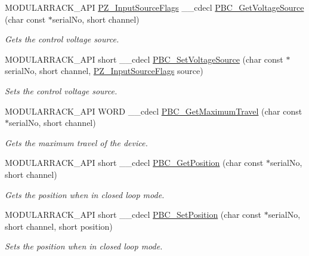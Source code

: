 \begin{DoxyCompactItemize}
M\+O\+D\+U\+L\+A\+R\+R\+A\+C\+K\+\_\+\+A\+PI \hyperlink{group___common_ga695c409512b2dd48c64f0e8e6ee823c0}{P\+Z\+\_\+\+Input\+Source\+Flags} \+\_\+\+\_\+cdecl \hyperlink{group___modular_piezo_gab02bee4e38888bfff0be0ad2e6ca32d4}{P\+B\+C\+\_\+\+Get\+Voltage\+Source} (char const $\ast$serial\+No, short channel)
\begin{DoxyCompactList}\small\item\em Gets the control voltage source. \end{DoxyCompactList}\item 
M\+O\+D\+U\+L\+A\+R\+R\+A\+C\+K\+\_\+\+A\+PI short \+\_\+\+\_\+cdecl \hyperlink{group___modular_piezo_ga2be618a28da3fa293bd6187038971ff8}{P\+B\+C\+\_\+\+Set\+Voltage\+Source} (char const $\ast$serial\+No, short channel, \hyperlink{group___common_ga695c409512b2dd48c64f0e8e6ee823c0}{P\+Z\+\_\+\+Input\+Source\+Flags} source)
\begin{DoxyCompactList}\small\item\em Sets the control voltage source. \end{DoxyCompactList}\item 
M\+O\+D\+U\+L\+A\+R\+R\+A\+C\+K\+\_\+\+A\+PI W\+O\+RD \+\_\+\+\_\+cdecl \hyperlink{group___modular_piezo_gaf63523576ceb86152013496e2f716a3d}{P\+B\+C\+\_\+\+Get\+Maximum\+Travel} (char const $\ast$serial\+No, short channel)
\begin{DoxyCompactList}\small\item\em Gets the maximum travel of the device. \end{DoxyCompactList}\item 
M\+O\+D\+U\+L\+A\+R\+R\+A\+C\+K\+\_\+\+A\+PI short \+\_\+\+\_\+cdecl \hyperlink{group___modular_piezo_ga37fbe0146214423a0a0bf44761eb3faa}{P\+B\+C\+\_\+\+Get\+Position} (char const $\ast$serial\+No, short channel)
\begin{DoxyCompactList}\small\item\em Gets the position when in closed loop mode. \end{DoxyCompactList}\item 
M\+O\+D\+U\+L\+A\+R\+R\+A\+C\+K\+\_\+\+A\+PI short \+\_\+\+\_\+cdecl \hyperlink{group___modular_piezo_ga78072305500361453083907f55554b62}{P\+B\+C\+\_\+\+Set\+Position} (char const $\ast$serial\+No, short channel, short position)
\begin{DoxyCompactList}\small\item\em Sets the position when in closed loop mode. \end{DoxyCompactList}\item 

\end{DoxyCompactItemize}
